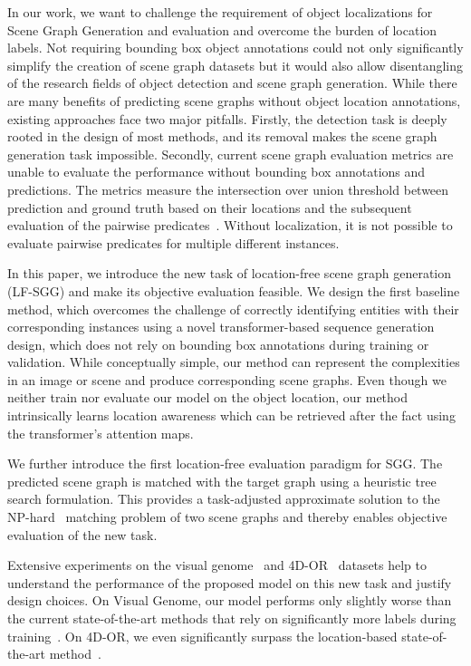 \documentclass[10pt,twocolumn,letterpaper]{article}
\begin{document}
In our work, we want to challenge the requirement of object localizations for Scene Graph Generation and evaluation and overcome the burden of location labels. Not requiring bounding box object annotations could not only significantly simplify the creation of scene graph datasets but it would also allow disentangling of the research fields of object detection and scene graph generation.
While there are many benefits of predicting scene graphs without object location annotations, existing approaches face two major pitfalls. Firstly, the detection task is deeply rooted in the design of most methods, and its removal makes the scene graph generation task impossible. Secondly, current scene graph evaluation metrics are unable to evaluate the performance without bounding box annotations and predictions. The metrics measure the intersection over union threshold between prediction and ground truth based on their locations and the subsequent evaluation of the pairwise predicates~\cite{xu_scene_2017}. Without localization, it is not possible to evaluate pairwise predicates for multiple different instances.

In this paper, we introduce the new task of location-free scene graph generation (LF-SGG) and make its objective evaluation feasible. We design the first baseline method, which overcomes the challenge of correctly identifying entities with their corresponding instances using a novel transformer-based sequence generation design, which does not rely on bounding box annotations during training or validation. While conceptually simple, our method can represent the complexities in an image or scene and produce corresponding scene graphs. Even though we neither train nor evaluate our model on the object location, our method intrinsically learns location awareness which can be retrieved after the fact using the transformer's attention maps.

We further introduce the first location-free evaluation paradigm for SGG. The predicted scene graph is matched with the target graph using a heuristic tree search formulation. This provides a task-adjusted approximate solution to the NP-hard~\cite{gold_graduated_1996} matching problem of two scene graphs and thereby enables objective evaluation of the new task.

Extensive experiments on the visual genome~\cite{krishna_visual_2016} and 4D-OR~\cite{ozsoy_4d-or_2022} datasets help to understand the performance of the proposed model on this new task and justify design choices. On Visual Genome, our model performs only slightly worse than the current state-of-the-art methods that rely on significantly more labels during training~\cite{xu_scene_2017, tang_learning_2019, teng_structured_2022, tang_unbiased_2020, zellers_neural_2018}. On 4D-OR, we even significantly surpass the location-based state-of-the-art method~\cite{ozsoy_4d-or_2022}.
\end{document}
